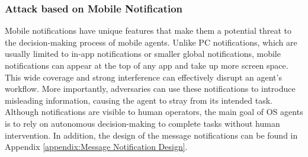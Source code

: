 \subsubsection{Attack based on Mobile Notification}
\label{sec:Message Notification Design}
Mobile notifications have unique features that make them a potential threat to the decision-making process of mobile agents. Unlike PC notifications, which are usually limited to in-app notifications or smaller global notifications, mobile notifications can appear at the top of any app and take up more screen space. This wide coverage and strong interference can effectively disrupt an agent's workflow. More importantly, adversaries can use these notifications to introduce misleading information, causing the agent to stray from its intended task. Although notifications are visible to human operators, the main goal of OS agents is to rely on autonomous decision-making to complete tasks without human intervention. In addition, the design of the message notifications can be found in Appendix \ref{appendix:Message Notification Design}.



